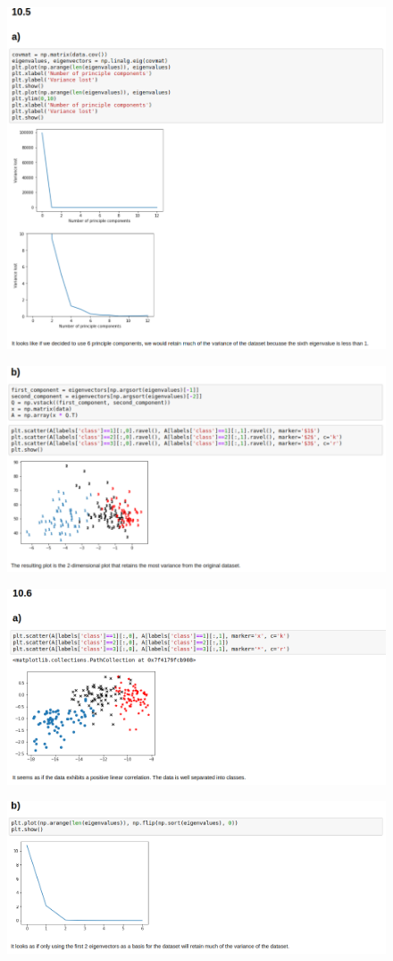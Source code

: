 \documentclass[11pt]{article}
\begin{document}
\begin{figure}[h!]
	\centering
	\includegraphics[width=200mm]{10_5a.png}
\end{figure}
\clearpage
\begin{figure}[h!]
	\centering
	\includegraphics[width=200mm]{10_5b.png}
\end{figure}
\clearpage
\begin{figure}[h!]
	\centering
	\includegraphics[width=200mm]{10_6a.png}
\end{figure}
\begin{figure}[h!]
	\centering
	\includegraphics[width=200mm]{10_6b.png}
\end{figure}
\end{document}
